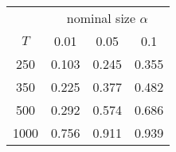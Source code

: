 % 
\begin{tabular}{cccc}
  \hline
  & \multicolumn{3}{c}{nominal size $\alpha$} \\
 $T$ & 0.01 & 0.05 & 0.1 \\
 \hline
250 & 0.103 & 0.245 & 0.355 \\ 
  350 & 0.225 & 0.377 & 0.482 \\ 
  500 & 0.292 & 0.574 & 0.686 \\ 
  1000 & 0.756 & 0.911 & 0.939 \\ 
   \hline
\end{tabular}
